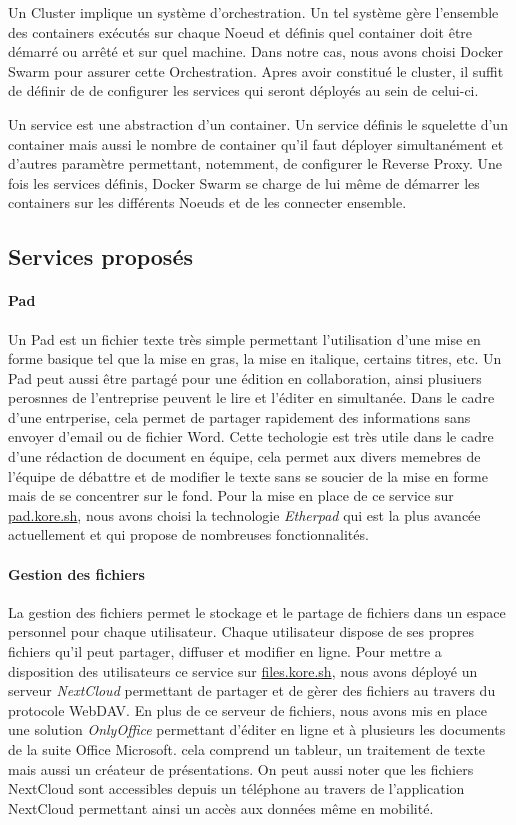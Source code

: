 Un Cluster implique un système d'orchestration.
Un tel système gère l'ensemble des containers exécutés sur chaque Noeud et définis quel container doit être démarré ou arrêté et sur quel machine.
Dans notre cas, nous avons choisi Docker Swarm pour assurer cette Orchestration.
Apres avoir constitué le cluster, il suffit de définir de de configurer les services qui seront déployés au sein de celui-ci.

Un service est une abstraction d'un container.
Un service définis le squelette d'un container mais aussi le nombre de container qu'il faut déployer simultanément et d'autres paramètre permettant, notemment, de configurer le Reverse Proxy.
Une fois les services définis, Docker Swarm se charge de lui même de démarrer les containers sur les différents Noeuds et de les connecter ensemble.

\subsection{Services proposés}

\paragraph{Pad} Un Pad est un fichier texte très simple permettant l'utilisation d'une mise en forme basique tel que la mise en gras, la mise en italique, certains titres, etc.
Un Pad peut aussi être partagé pour une édition en collaboration, ainsi plusiuers perosnnes de l'entreprise peuvent le lire et l'éditer en simultanée.
Dans le cadre d'une entrperise, cela permet de partager rapidement des informations sans envoyer d'email ou de fichier Word.
Cette techologie est très utile dans le cadre d'une rédaction de document en équipe, cela permet aux divers memebres de l'équipe de débattre et de modifier le texte sans se soucier de la mise en forme mais de se concentrer sur le fond.
Pour la mise en place de ce service sur \url{pad.kore.sh}, nous avons choisi la technologie \emph{Etherpad} qui est la plus avancée actuellement et qui propose de nombreuses fonctionnalités.

\paragraph{Gestion des fichiers} La gestion des fichiers permet le stockage et le partage de fichiers dans un espace personnel pour chaque utilisateur.
Chaque utilisateur dispose de ses propres fichiers qu'il peut partager, diffuser et modifier en ligne.
Pour mettre a disposition des utilisateurs ce service sur \url{files.kore.sh}, nous avons déployé un serveur \emph{NextCloud} permettant de partager et de gèrer des fichiers au travers du protocole WebDAV.
En plus de ce serveur de fichiers, nous avons mis en place une solution \emph{OnlyOffice} permettant d'éditer en ligne et à plusieurs les documents de la suite Office Microsoft.
cela comprend un tableur, un traitement de texte mais aussi un créateur de présentations.
On peut aussi noter que les fichiers NextCloud sont accessibles depuis un téléphone au travers de l'application NextCloud permettant ainsi un accès aux données même en mobilité.

